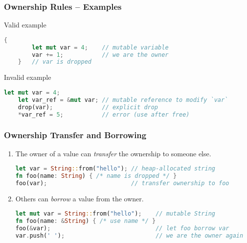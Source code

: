 \begin{frame}[fragile]
    \frametitle{Ownership Rules -- Examples}

    \begin{block}{Valid example}
    \begin{lstlisting}[language=rust]
    {
        let mut var = 4;    // mutable variable
        var += 1;           // we are the owner
    }   // var is dropped
    \end{lstlisting}
    \end{block}

    \pause

    \begin{block}{Invalid example}
    \begin{lstlisting}[language=rust]
    let mut var = 4;
    let var_ref = &mut var; // mutable reference to modify `var`
    drop(var);              // explicit drop
    *var_ref = 5;           // error (use after free)
    \end{lstlisting}
    \end{block}
\end{frame}

\begin{frame}[fragile]
    \frametitle{Ownership Transfer and Borrowing}

    \begin{enumerate}
        \item The owner of a value can \emph{transfer} the ownership to someone else.
    \begin{lstlisting}[language=rust]
let var = String::from("hello"); // heap-allocated string
fn foo(name: String) { /* name is dropped */ }
foo(var);                        // transfer ownership to foo
    \end{lstlisting}

    \pause

        \item Others can \emph{borrow} a value from the owner.
    \begin{lstlisting}[language=rust]
let mut var = String::from("hello");    // mutable String
fn foo(name: &String) { /* use name */ }
foo(&var);                              // let foo borrow var
var.push(' ');                          // we are the owner again
    \end{lstlisting}
    \end{enumerate}
\end{frame}
